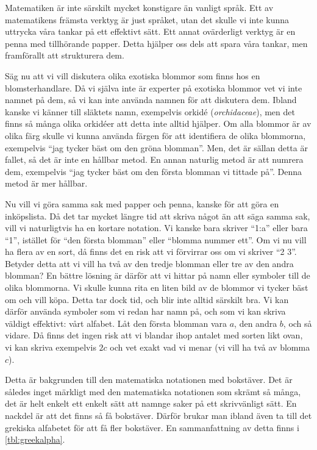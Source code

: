 Matematiken är inte särskilt mycket konstigare än vanligt språk.
Ett av matematikens främsta verktyg är just språket, utan det skulle vi inte 
kunna uttrycka våra tankar på ett effektivt sätt.
Ett annat ovärderligt verktyg är en penna med tillhörande papper.
Detta hjälper oss dels att spara våra tankar, men framförallt att strukturera 
dem.

Säg nu att vi vill diskutera olika exotiska blommor som finns hos en 
blomsterhandlare.
Då vi själva inte är experter på exotiska blommor vet vi inte namnet på dem, så 
vi kan inte använda namnen för att diskutera dem.
Ibland kanske vi känner till släktets namn, exempelvis orkidé 
(\emph{orchidaceae}), men det finns så många olika orkidéer att detta inte 
alltid hjälper.
Om alla blommor är av olika färg skulle vi kunna använda färgen för att 
identifiera de olika blommorna, exempelvis \enquote{jag tycker bäst om den 
gröna blomman}.
Men, det är sällan detta är fallet, så det är inte en hållbar metod.
En annan naturlig metod är att numrera dem, exempelvis \enquote{jag tycker bäst 
om den första blomman vi tittade på}.
Denna metod är mer hållbar.

Nu vill vi göra samma sak med papper och penna, kanske för att göra en 
inköpslista.
Då det tar mycket längre tid att skriva något än att säga samma sak, vill vi 
naturligtvis ha en kortare notation.
Vi kanske bara skriver \enquote{1:a} eller bara \enquote{1}, istället för 
\enquote{den första blomman} eller \enquote{blomma nummer ett}.
Om vi nu vill ha flera av en sort, då finns det en risk att vi förvirrar oss om 
vi skriver \enquote{2 3}.
Betyder detta att vi vill ha två av den tredje blomman eller tre av den andra 
blomman?
En bättre lösning är därför att vi hittar på namn eller symboler till de olika 
blommorna.
Vi skulle kunna rita en liten bild av de blommor vi tycker bäst om och vill 
köpa.
Detta tar dock tid, och blir inte alltid särskilt bra.
Vi kan därför använda symboler som vi redan har namn på, och som vi kan skriva 
väldigt effektivt: vårt alfabet.
Låt den första blomman vara \(a\), den andra \(b\), och så vidare.
Då finns det ingen risk att vi blandar ihop antalet med sorten likt ovan, vi 
kan skriva exempelvis \(2c\) och vet exakt vad vi menar (vi vill ha två av 
blomma \(c\)).

Detta är bakgrunden till den matematiska notationen med bokstäver.
Det är således inget märkligt med den matematiska notationen som skrämt så 
många, det är helt enkelt ett enkelt sätt att namnge saker på ett skrivvänligt 
sätt.
En nackdel är att det finns så få bokstäver.
Därför brukar man ibland även ta till det grekiska alfabetet för att få fler 
bokstäver.
En sammanfattning av detta finns i \cref{tbl:greekalpha}.

